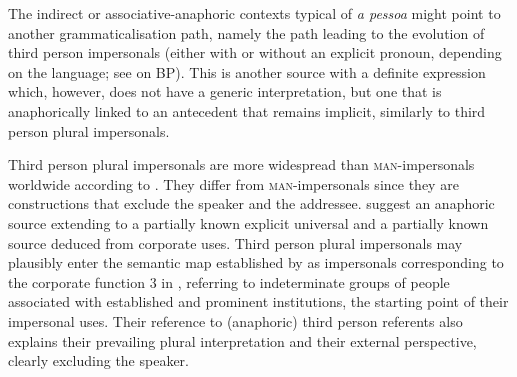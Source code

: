 \documentclass[output=paper]{langscibook}
\begin{document}
{The indirect or associative-anaphoric contexts typical of} {\textit{a pessoa}} {might point to another grammaticalisation path, namely the path leading to the evolution of third person impersonals (either with or without an explicit pronoun, depending on the language; see \citealt{Carvalho2020} on BP). This is another source with a definite expression which, however, does not have a generic interpretation, but one that is anaphorically linked to an antecedent that remains implicit, similarly to third person plural impersonals.}



{Third person plural impersonals are more widespread than} {\textsc{man}}{{}-impersonals worldwide according to \citet[69]{Siewierska2011}. They differ from} {\textsc{man}}{{}-impersonals since they are constructions that exclude the speaker and the addressee. \citet[604]{SiewierskaPapastathi2011} suggest an anaphoric source extending to a partially known explicit universal and a partially known source deduced from corporate uses. Third person plural impersonals may plausibly enter the semantic map established by \citet{GastvanderAuwera2013} as impersonals corresponding to the corporate function 3 in , referring to indeterminate groups of people associated with established and prominent institutions, the starting point of their impersonal uses. Their reference to (anaphoric) third person referents also explains their prevailing plural interpretation and their external perspective, clearly excluding the speaker.} 
\end{document}
